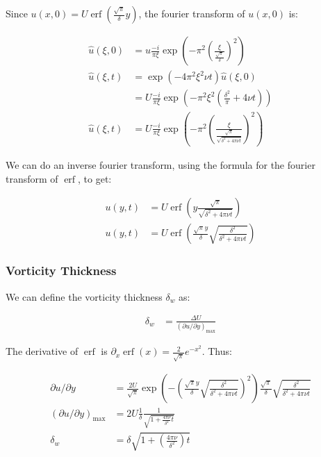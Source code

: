 \documentclass{article}
\DeclareMathOperator\erf{erf}
\begin{document}
Since $u(x,0) = U \erf \left( \frac{\sqrt{\pi}}{\delta} y \right) $,
	the fourier transform of $u(x, 0)$ is:

\begin{align}
\hat{u}(\xi, 0) & = u
	\frac{- i }{\pi \xi}\exp \left(-\pi^2 
		\left( \frac{\xi}{\frac{\sqrt{\pi}}{\delta}} \right)^2 \right)\\
\hat{u}(\xi, t) & = 
	\exp \left( - 4 \pi^2 \xi^2 \nu t \right) \hat{u}(\xi, 0) \nonumber \\
& = U
	\frac{- i }{\pi \xi}\exp \left(-\pi^2 \xi^2 
		\left( \frac{\delta^2}{\pi}
		+ 4 \nu t \right) \right) \nonumber\\
\hat{u}(\xi, t) &  = U \frac{- i}{\pi \xi} 
	\exp\left(- \pi^2 \left( \frac{\xi}{\frac{\sqrt{\pi}}{
	\sqrt{\delta^2 + 4 \pi \nu t}}} \right)^2 \right)
\end{align}

We can do an inverse fourier transform, using the formula for the fourier
	transform of $\erf$, to get:

\begin{align}
u(y,t) & = U \erf \left( y \frac{\sqrt{\pi}}
	{\sqrt{\delta^2 + 4 \pi \nu t}} \right) \nonumber \\
u(y,t) & = U \erf \left( \frac{ \sqrt{\pi} y}{\delta} 
	\sqrt{ \frac{\delta^2}{\delta^2 + 4 \pi \nu t}} \right) 
\end{align}

\subsubsection{Vorticity Thickness}

We can define the vorticity thickness $\delta_w$ as:

\begin{align}
\delta_w & = \frac{\Delta U}{\left( \partial u / \partial y \right)_\text{max}}
\end{align}

The derivative of $\erf$ is $\partial_x \erf(x) 
	= \frac{2}{\sqrt{\pi}} e^{-x^2}$.
Thus:

\begin{align}
\partial u / \partial y & = \frac{2 U}{\sqrt{\pi}} 
	\exp \left( - \left( \frac{ \sqrt{\pi} y}{\delta} 
	\sqrt{ \frac{\delta^2}{\delta^2 + 4 \pi \nu t}} \right)^2 \right) 
	\frac{ \sqrt{\pi}}{\delta} 
	\sqrt{ \frac{\delta^2}{\delta^2 + 4 \pi \nu t}} \nonumber \\
\left( \partial u / \partial y \right)_\text{max} & =
	2 U \frac{1}{\delta} \frac{1}{\sqrt{1 + \frac{4 \pi \nu}{\delta^2} t}}\\
\delta_w & = \delta \sqrt{ 1 + \left( \frac{4 \pi \nu}{\delta^2} \right) t } 
\end{align}
\end{document}
